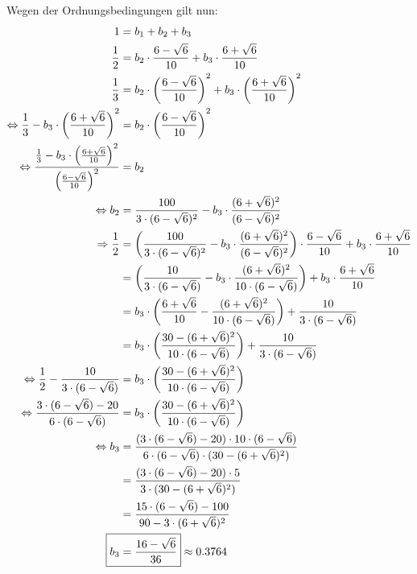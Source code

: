 Wegen der Ordnungsbedingungen gilt nun:
\begin{align}
    1 &= b_1 + b_2 + b_3\\
    \frac{1}{2} &= b_2 \cdot \frac{6-\sqrt{6}}{10} + b_3 \cdot \frac{6+\sqrt{6}}{10}\\
    \frac{1}{3} &= b_2 \cdot \left (\frac{6-\sqrt{6}}{10} \right )^2 + b_3 \cdot \left (\frac{6+\sqrt{6}}{10} \right )^2\\
    \Leftrightarrow \frac{1}{3} - b_3 \cdot \left (\frac{6+\sqrt{6}}{10} \right )^2 &= b_2 \cdot \left (\frac{6-\sqrt{6}}{10} \right )^2\\
    \Leftrightarrow \frac{\frac{1}{3} - b_3 \cdot \left (\frac{6+\sqrt{6}}{10} \right )^2}{\left (\frac{6-\sqrt{6}}{10} \right )^2} &= b_2\\
    \Leftrightarrow b_2 &= \frac{100}{3 \cdot (6-\sqrt{6})^2} - b_3 \cdot \frac{(6+\sqrt{6})^2}{(6-\sqrt{6})^2}\\
    \Rightarrow \frac{1}{2} &= \left ( \frac{100}{3 \cdot (6-\sqrt{6})^2} - b_3 \cdot \frac{(6+\sqrt{6})^2}{(6-\sqrt{6})^2} \right ) \cdot \frac{6-\sqrt{6}}{10} + b_3 \cdot \frac{6+\sqrt{6}}{10}\\
    &= \left (\frac{10}{3 \cdot (6 - \sqrt{6})} - b_3 \cdot \frac{(6+\sqrt{6})^2}{10 \cdot (6 - \sqrt{6})} \right ) + b_3 \cdot \frac{6+\sqrt{6}}{10}\\
    &= b_3 \cdot \left (\frac{6+\sqrt{6}}{10} - \frac{(6+\sqrt{6})^2}{10 \cdot (6 - \sqrt{6})} \right ) + \frac{10}{3 \cdot (6 - \sqrt{6})}\\
    &= b_3 \cdot \left (\frac{30-(6+\sqrt{6})^2}{10 \cdot (6 - \sqrt{6})} \right ) + \frac{10}{3 \cdot (6 - \sqrt{6})}\\
\Leftrightarrow \frac{1}{2} - \frac{10}{3 \cdot (6 - \sqrt{6})} &= b_3 \cdot \left (\frac{30-(6+\sqrt{6})^2}{10 \cdot (6 - \sqrt{6})} \right )\\
\Leftrightarrow \frac{3 \cdot (6 - \sqrt{6}) - 20}{6\cdot (6 - \sqrt{6})} &= b_3 \cdot \left (\frac{30-(6+\sqrt{6})^2}{10 \cdot (6 - \sqrt{6})} \right )\\
\Leftrightarrow b_3 &= \frac{(3 \cdot (6 - \sqrt{6}) - 20) \cdot 10 \cdot (6 - \sqrt{6})}{6\cdot (6 - \sqrt{6}) \cdot (30-(6+\sqrt{6})^2)}\\
&= \frac{(3 \cdot (6 - \sqrt{6}) - 20) \cdot 5}{3 \cdot (30-(6+\sqrt{6})^2)}\\
&= \frac{15 \cdot (6 - \sqrt{6}) - 100}{90-3 \cdot (6+\sqrt{6})^2}\\
   \Aboxed{b_3 &= \frac{16-\sqrt{6}}{36}} \approx 0.3764\\

\end{align}
